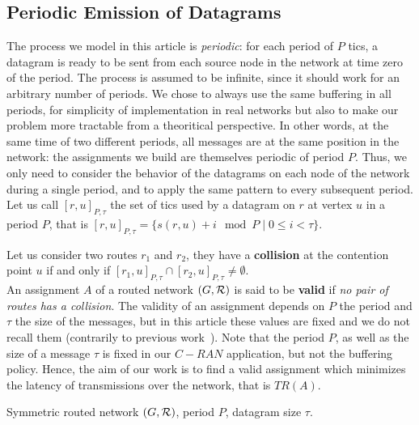 \documentclass[english]{article}
\begin{document}
     
  \subsection{Periodic Emission of Datagrams}

 	The process we model in this article is \emph{periodic}: for each period of $P$ tics, a datagram is ready to be sent from each source node in the network at time zero of the period. The process is assumed to be infinite, since it should work for an arbitrary number of periods. We chose to always use the same buffering in all periods, for simplicity of implementation in real networks but also to make our problem more tractable from a theoritical perspective. In other words, at the same time of two different periods, all messages are at the same position in the network: the assignments we build are themselves periodic of period $P$. Thus, we only need to consider the behavior of the datagrams on each node of the network during a single period, and to apply the same pattern to every subsequent period. 
    Let us call $[r,u]_{P,\tau}$ the set of tics used by a datagram on $r$ at vertex $u$ in a period $P$, that is $[r,u]_{P,\tau} = \{s(r,u) + i \mod P \mid 0 \leq i < \tau \}$. 

      Let us consider two routes $r_1$ and $r_2$, they have a {\bf collision} at the contention point $u$ if and only if $[r_1,u]_{P,\tau} \cap [r_2,u]_{P,\tau} \neq \emptyset$.\\

        An assignment $A$ of a routed network $(G,{\cal R})$ is said to be \textbf{valid} if \emph{no pair of routes has a collision}. 
        The validity of an assignment depends on $P$ the period and $\tau$ the size of the messages, but in this article these values are fixed and we do not recall them (contrarily to previous work~\cite{Guir1806:Deterministic}).
        Note that the period $P$, as well as the size of a message $\tau$ is fixed in our $C-RAN$ application, but not the buffering policy. Hence, the aim of our work is to find a valid assignment which minimizes the latency of transmissions over the network, that is $TR(A)$.
       \\ 
       

        Symmetric routed network $(G,{\cal R})$, period $P$, datagram size $\tau$.%
      
\end{document}

